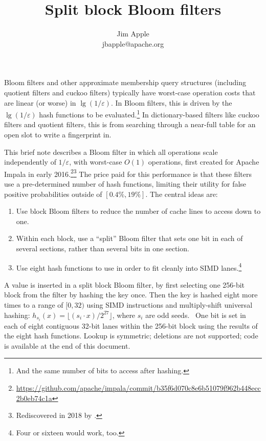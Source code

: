 \documentclass[letterpaper, 11pt]{article}
\begin{document}
\title{Split block Bloom filters}
\author{Jim Apple \\
  jbapple@apache.org}
\maketitle
\thispagestyle{empty}

Bloom filters and other approximate membership query structures (including quotient filters and cuckoo filters) typically have worst-case operation costs that are linear (or worse) in $\lg (1/\varepsilon)$. \cite{cuckoo-filter,quotient-filter}
In Bloom filters, this is driven by the $\lg (1/\varepsilon)$ hash functions to be evaluated.\footnote{And the same number of bits to access after hashing.}
In dictionary-based filters like cuckoo filters and quotient filters, this is from searching through a near-full table for an open slot to write a fingerprint in.

This brief note describes a Bloom filter in which all operations scale independently of $1/\varepsilon$, with worst-case $O(1)$ operations, first created for Apache Impala in early 2016.\footnote{\url{https://github.com/apache/impala/commit/b35f6d070c8e6b51079f962b448ecc2b0eb74c1a}}\footnote{Rediscovered in 2018 by \cite{ultra-fast}.}
The price paid for this performance is that these filters use a pre-determined number of hash functions, limiting their utility for false positive probabilities outside of $[0.4\%, 19\%]$.
The central ideas are:

\begin{enumerate}
\item Use block Bloom filters to reduce the number of cache lines to access down to one.~\cite{block}
\item Within each block, use a ``split'' Bloom filter that sets one bit in each of several sections, rather than several bits in one section.~\cite{split-bloom}
\item Use eight hash functions to use in order to fit cleanly into SIMD lanes.\footnote{Four or sixteen would work, too.}
\end{enumerate}

A value is inserted in a split block Bloom filter, by first selecting one 256-bit block from the filter by hashing the key once.
Then the key is hashed eight more times to a range of $[0,32)$ using SIMD instructions and multiply-shift universal hashing: $h_{s_i}(x) = \lfloor(s_i \cdot x) / 2^{27}\rfloor$, where $s_i$ are odd seeds.~\cite{multiply-shift}
One bit is set in each of eight contiguous 32-bit lanes within the 256-bit block using the results of the eight hash functions.
Lookup is symmetric; deletions are not supported; code is available at the end of this document.
\end{document}
